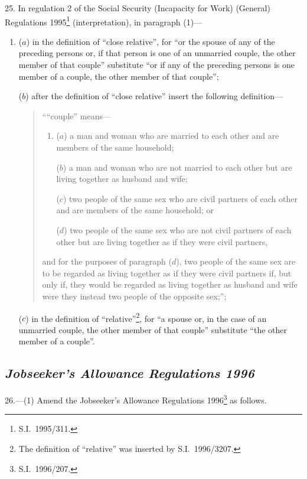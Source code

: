 \documentclass[12pt,a4paper]{article}
\begin{document}
25.  In regulation 2 of the Social Security (Incapacity for Work) (General) Regulations 1995\footnote{S.I.\ 1995/311.} (interpretation), in paragraph (1)—
\begin{enumerate}\item[]
($a$) in the definition of “close relative”, for “or the spouse of any of the preceding persons or, if that person is one of an unmarried couple, the other member of that couple” substitute “or if any of the preceding persons is one member of a couple, the other member of that couple”;

($b$) after the definition of “close relative” insert the following definition—
\begin{quotation}
““couple” means—
\begin{enumerate}\item[]
($a$) 
a man and woman who are married to each other and are members of the same household;

($b$) 
a man and woman who are not married to each other but are living together as husband and wife;

($c$) 
two people of the same sex who are civil partners of each other and are members of the same household; or

($d$) 
two people of the same sex who are not civil partners of each other but are living together as if they were civil partners,
\end{enumerate}
and for the purposes of paragraph ($d$), two people of the same sex are to be regarded as living together as if they were civil partners if, but only if, they would be regarded as living together as husband and wife were they instead two people of the opposite sex;”;
\end{quotation}

($c$) in the definition of “relative”\footnote{The definition of “relative” was inserted by S.I.\ 1996/3207.}, for “a spouse or, in the case of an unmarried couple, the other member of that couple” substitute “the other member of a couple”.
\end{enumerate}

\subsection*{\itshape Jobseeker’s Allowance Regulations 1996}

26.---(1)  Amend the Jobseeker’s Allowance Regulations 1996\footnote{S.I.\ 1996/207.} as follows.
\end{document}
